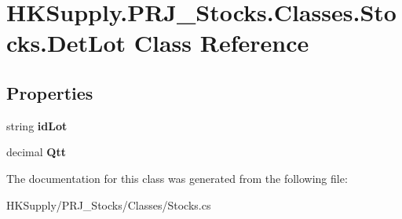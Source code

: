 \hypertarget{class_h_k_supply_1_1_p_r_j___stocks_1_1_classes_1_1_stocks_1_1_det_lot}{}\section{H\+K\+Supply.\+P\+R\+J\+\_\+\+Stocks.\+Classes.\+Stocks.\+Det\+Lot Class Reference}
\label{class_h_k_supply_1_1_p_r_j___stocks_1_1_classes_1_1_stocks_1_1_det_lot}
\subsection*{Properties}
\begin{DoxyCompactItemize}
\item 
\mbox{\label{class_h_k_supply_1_1_p_r_j___stocks_1_1_classes_1_1_stocks_1_1_det_lot_a1731e7ffd15dbf4a797044425489a319}} 
string {\bfseries id\+Lot}
\item 
\mbox{\label{class_h_k_supply_1_1_p_r_j___stocks_1_1_classes_1_1_stocks_1_1_det_lot_ab6b941825a51c6c68e0363b30269d08e}} 
decimal {\bfseries Qtt}
\end{DoxyCompactItemize}


The documentation for this class was generated from the following file\+:\begin{DoxyCompactItemize}
\item 
H\+K\+Supply/\+P\+R\+J\+\_\+\+Stocks/\+Classes/Stocks.\+cs\end{DoxyCompactItemize}
